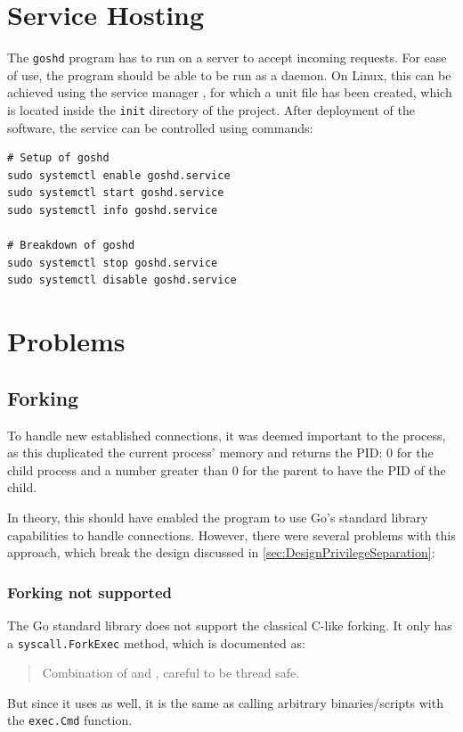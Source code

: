 \documentclass[10pt,a4paper,titlepage,twoside,english,final]{zhawreprt}
\begin{document}
\section{Service Hosting}\label{sec:ImplServiceHosting}
The \texttt{goshd} program has to run on a server to accept incoming requests.
For ease of use, the program should be able to be run as a \gls{daemon}.
On \gls{Linux}, this can be achieved using the service manager \cite{systemd}, for which a unit file has been created, which is located inside the \texttt{init} directory of the project.
After deployment of the software, the service can be controlled using \cite{systemd} commands:
\setlistingBash
\begin{lstlisting}[caption={\texttt{goshd} service control},label=lst:GoshdServiceCtl,deletekeywords={enable}]
# Setup of goshd
sudo systemctl enable goshd.service
sudo systemctl start goshd.service
sudo systemctl info goshd.service

# Breakdown of goshd
sudo systemctl stop goshd.service
sudo systemctl disable goshd.service
\end{lstlisting}


\section{Problems}\label{sec:Problems}
\subsection{Forking}\label{ssec:Forking}
To handle new established connections, it was deemed important to \cite{fork} the process, as this duplicated the current process' memory and returns the \gls{PID}: 0 for the child process and a number greater than 0 for the parent to have the \gls{PID} of the child.

In theory, this should have enabled the program to use \gls{Go}'s standard library capabilities to handle connections.
However, there were several problems with this approach, which break the design discussed in \ref{sec:DesignPrivilegeSeparation}:

\subsubsection{Forking not supported}\label{sssec:ForkingNotSupported}
The \gls{Go} standard library does not support the classical \gls{C}-like forking.
It only has a \texttt{syscall.\linebreak{}ForkExec} method, which is documented as:
\begin{quote}
Combination of \cite{fork} and \cite{exec}, careful to be thread safe.
\end{quote}
But since it uses \cite{exec} as well, it is the same as calling arbitrary binaries/scripts with the \texttt{exec.Cmd} function.
\end{document}
